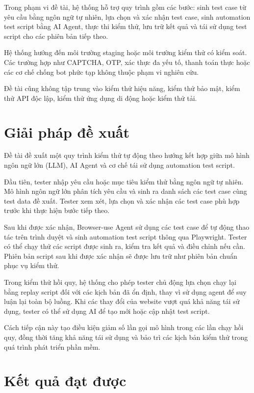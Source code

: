 Trong phạm vi đề tài, hệ thống hỗ trợ quy trình gồm các bước: sinh test case từ yêu cầu bằng ngôn ngữ tự nhiên, lựa chọn và xác nhận test case, sinh automation test script bằng AI Agent, thực thi kiểm thử, lưu trữ kết quả và tái sử dụng test script cho các phiên bản tiếp theo.

Hệ thống hướng đến môi trường staging hoặc môi trường kiểm thử có kiểm soát. Các trường hợp như CAPTCHA, OTP, xác thực đa yếu tố, thanh toán thực hoặc các cơ chế chống bot phức tạp không thuộc phạm vi nghiên cứu.

Đề tài cũng không tập trung vào kiểm thử hiệu năng, kiểm thử bảo mật, kiểm thử API độc lập, kiểm thử ứng dụng di động hoặc kiểm thử tải.

\section{Giải pháp đề xuất}

Đề tài đề xuất một quy trình kiểm thử tự động theo hướng kết hợp giữa mô hình ngôn ngữ lớn (LLM), AI Agent và cơ chế tái sử dụng automation test script.

Đầu tiên, tester nhập yêu cầu hoặc mục tiêu kiểm thử bằng ngôn ngữ tự nhiên. Mô hình ngôn ngữ lớn phân tích yêu cầu và sinh ra danh sách các test case cùng test data đề xuất. Tester xem xét, lựa chọn và xác nhận các test case phù hợp trước khi thực hiện bước tiếp theo.

Sau khi được xác nhận, Browser-use Agent sử dụng các test case để tự động thao tác trên trình duyệt và sinh automation test script thông qua Playwright. Tester có thể chạy thử các script được sinh ra, kiểm tra kết quả và điều chỉnh nếu cần. Phiên bản script sau khi được xác nhận sẽ được lưu trữ như phiên bản chuẩn phục vụ kiểm thử.

Trong kiểm thử hồi quy, hệ thống cho phép tester chủ động lựa chọn chạy lại bằng replay script đối với các kịch bản đã ổn định, thay vì sử dụng agent để suy luận lại toàn bộ luồng. Khi các thay đổi của website vượt quá khả năng tái sử dụng, tester có thể sử dụng AI để tạo mới hoặc cập nhật test script.

Cách tiếp cận này tạo điều kiện giảm số lần gọi mô hình trong các lần chạy hồi quy, đồng thời tăng khả năng tái sử dụng và bảo trì các kịch bản kiểm thử trong quá trình phát triển phần mềm.

\section{Kết quả đạt được}

